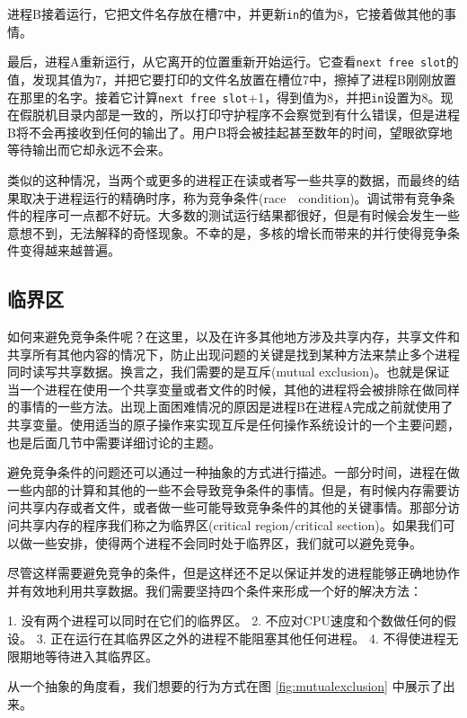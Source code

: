 	进程B接着运行，它把文件名存放在槽7中，并更新\texttt{in}的值为8，它接着做其他的事情。
	
	最后，进程A重新运行，从它离开的位置重新开始运行。它查看\texttt{next free slot}的值，发现其值为7，并把它要打印的文件名放置在槽位7中，擦掉了进程B刚刚放置在那里的名字。接着它计算\texttt{next free slot}+1，得到值为8，并把\texttt{in}设置为8。现在假脱机目录内部是一致的，所以打印守护程序不会察觉到有什么错误，但是进程B将不会再接收到任何的输出了。用户B将会被挂起甚至数年的时间，望眼欲穿地等待输出而它却永远不会来。
	
	类似的这种情况，当两个或更多的进程正在读或者写一些共享的数据，而最终的结果取决于进程运行的精确时序，称为竞争条件(race　condition)。调试带有竞争条件的程序可一点都不好玩。大多数的测试运行结果都很好，但是有时候会发生一些意想不到，无法解释的奇怪现象。不幸的是，多核的增长而带来的并行使得竞争条件变得越来越普遍。
	
	\subsection{临界区}
	
	如何来避免竞争条件呢？在这里，以及在许多其他地方涉及共享内存，共享文件和共享所有其他内容的情况下，防止出现问题的关键是找到某种方法来禁止多个进程同时读写共享数据。换言之，我们需要的是互斥(mutual exclusion)。也就是保证当一个进程在使用一个共享变量或者文件的时候，其他的进程将会被排除在做同样的事情的一些方法。出现上面困难情况的原因是进程B在进程A完成之前就使用了共享变量。使用适当的原子操作来实现互斥是任何操作系统设计的一个主要问题，也是后面几节中需要详细讨论的主题。
	
	避免竞争条件的问题还可以通过一种抽象的方式进行描述。一部分时间，进程在做一些内部的计算和其他的一些不会导致竞争条件的事情。但是，有时候内存需要访问共享内存或者文件，或者做一些可能导致竞争条件的其他的关键事情。那部分访问共享内存的程序我们称之为临界区(critical region/critical section)。如果我们可以做一些安排，使得两个进程不会同时处于临界区，我们就可以避免竞争。
	
	尽管这样需要避免竞争的条件，但是这样还不足以保证并发的进程能够正确地协作并有效地利用共享数据。我们需要坚持四个条件来形成一个好的解决方法：
	
	1. 没有两个进程可以同时在它们的临界区。 
	2. 不应对CPU速度和个数做任何的假设。
	3. 正在运行在其临界区之外的进程不能阻塞其他任何进程。
	4. 不得使进程无限期地等待进入其临界区。
	
	从一个抽象的角度看，我们想要的行为方式在图 \ref{fig:mutualexclusion} 中展示了出来。
	
